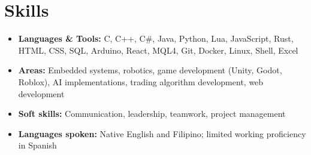 \documentclass[10pt,letterpaper]{article}
\begin{document}
\section{Skills}
\begin{itemize}[leftmargin=0pt,label={},itemsep=2pt]
  \item \textbf{Languages \& Tools:} C, C++, C\#, Java, Python, Lua, JavaScript, Rust, HTML, CSS, SQL, Arduino, React, MQL4, Git, Docker, Linux, Shell, Excel
  \item \textbf{Areas:} Embedded systems, robotics, game development (Unity, Godot, Roblox), AI implementations, trading algorithm development, web development
  \item \textbf{Soft skills:} Communication, leadership, teamwork, project management
  \item \textbf{Languages spoken:} Native English and Filipino; limited working proficiency in Spanish
\end{itemize}
\end{document}
